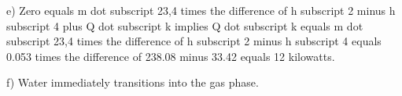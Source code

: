 e) Zero equals m dot subscript 23,4 times the difference of h subscript 2 minus h subscript 4 plus Q dot subscript k implies Q dot subscript k equals m dot subscript 23,4 times the difference of h subscript 2 minus h subscript 4 equals 0.053 times the difference of 238.08 minus 33.42 equals 12 kilowatts.

f) Water immediately transitions into the gas phase.